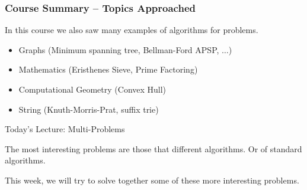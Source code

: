 \begin{frame}
  \frametitle{Course Summary -- Topics Approached}

  \begin{exampleblock}{}
    In this course we also saw many examples of 
    algorithms for problems.
  \end{exampleblock}

  \vfill

  \begin{itemize}
  \item Graphs (Minimum spanning tree, Bellman-Ford APSP, $\ldots$)
  \item Mathematics (Eristhenes Sieve, Prime Factoring)
  \item Computational Geometry (Convex Hull)
  \item String (Knuth-Morris-Prat, suffix trie)
  \end{itemize}

\end{frame}

\begin{frame}{Today's Lecture: Multi-Problems}

  The most interesting problems are those that  different algorithms. Or  of
  standard algorithms.

  \bigskip

  This week, we will try to solve together some of these more
  interesting problems.
\end{frame}
